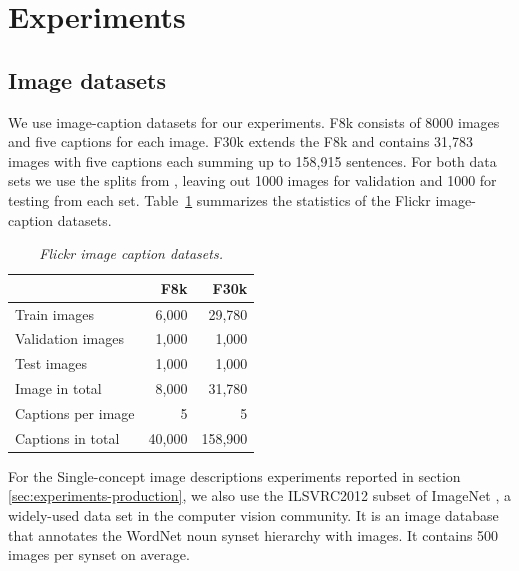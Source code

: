 \section{Experiments}
\label{sec:experiments}


\subsection{Image datasets}
\label{sec:dataset}
We use image-caption datasets for our experiments.
F8k \citep{rashtchian2010collecting} consists of 8000 images and five
captions for each image. F30k \citep{young2014image} extends the F8k and contains 31,783 images
with five captions each summing up to 158,915 sentences. For both data
sets we use the splits from \cite{karpathy2014deep}, leaving out 1000
images for validation and 1000 for testing from each
set. Table~\ref{tab:flickr} summarizes the statistics of the Flickr
image-caption datasets.



\begin{table}[h]
\centering
\begin{tabular}{l|r|r}
                    & F8k    & F30k   \\ \hline
Train images        & 6,000       & 29,780  \\
Validation images   & 1,000       & 1,000   \\
Test images         & 1,000       & 1,000   \\
Image in total      & 8,000       & 31,780  \\
Captions per image  & 5           & 5      \\
Captions in total   & 40,000      & 158,900 \\
\end{tabular}
\caption{\textit{Flickr image caption datasets.}}
\label{tab:flickr}
\end{table}
For the Single-concept image descriptions experiments reported in
section \ref{sec:experiments-production}, we also use the ILSVRC2012
subset of ImageNet \citep{russakovsky2015imagenet}, a widely-used data set in the computer vision
community. It is an image database that annotates the WordNet noun
synset hierarchy with images. It contains 500 images per synset on
average.

